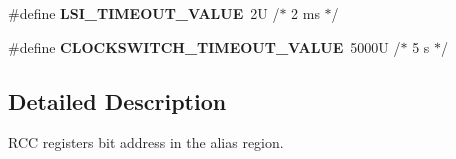 \begin{DoxyCompactItemize}
\mbox{\label{group___r_c_c___bit_address___alias_region_gad52c7f624c88b0c82ab41b9dbd2b347f}} 
\#define {\bfseries L\+S\+I\+\_\+\+T\+I\+M\+E\+O\+U\+T\+\_\+\+V\+A\+L\+UE}~2\+U  /$\ast$ 2 ms $\ast$/
\item 
\mbox{\label{group___r_c_c___bit_address___alias_region_gab3caadc0f23d394d1033aba55d31fcdc}} 
\#define {\bfseries C\+L\+O\+C\+K\+S\+W\+I\+T\+C\+H\+\_\+\+T\+I\+M\+E\+O\+U\+T\+\_\+\+V\+A\+L\+UE}~5000\+U /$\ast$ 5 s $\ast$/
\end{DoxyCompactItemize}


\subsection{Detailed Description}
R\+CC registers bit address in the alias region. 

